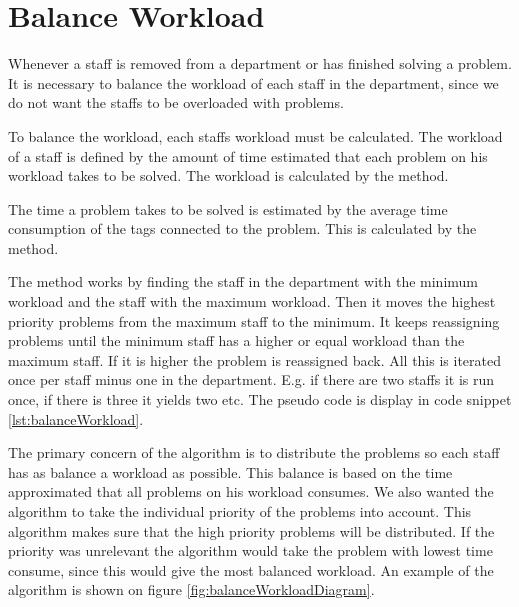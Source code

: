 \section{Balance Workload}
Whenever a staff is removed from a department or has finished solving a problem. 
It is necessary to balance the workload of each staff in the department, since we do not want the staffs to be overloaded with problems. 

To balance the workload, each staffs workload must be calculated. 
The workload of a staff is defined by the amount of time estimated that each problem on his workload takes to be solved. The workload is calculated by the  method.

The time a problem takes to be solved is estimated by the average time consumption of the tags connected to the problem. This is calculated by the  method.

The  method works by finding the staff in the department with the minimum workload and the staff with the maximum workload. Then it moves the highest priority problems from the maximum staff to the minimum. It keeps reassigning problems until the minimum staff has a higher or equal workload than the maximum staff. If it is higher the problem is reassigned back. All this is iterated once per staff minus one in the department. E.g. if there are two staffs it is run once, if there is three it yields two etc. The pseudo code is display in code snippet \ref{lst:balanceWorkload}.

The primary concern of the algorithm is to distribute the problems so each staff has as balance a workload as possible. 
This balance is based on the time approximated that all problems on his workload consumes. We also wanted the algorithm to take the individual priority of the problems into account. This algorithm makes sure that the high priority problems will be distributed. 
If the priority was unrelevant the algorithm would take the problem with lowest time consume, since this would give the most balanced workload. 
An example of the algorithm is shown on figure \ref{fig:balanceWorkloadDiagram}. 



